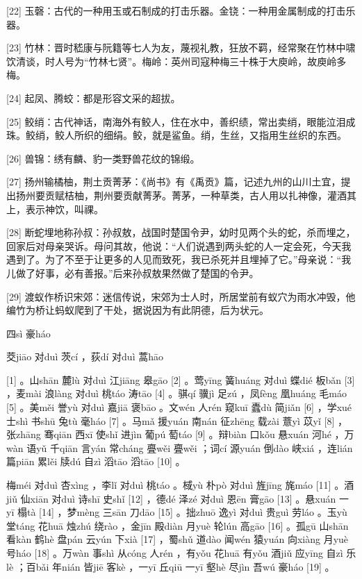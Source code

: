 \documentclass[12pt,UTF8]{ctexbook}
\begin{document}
[22] 玉磬：古代的一种用玉或石制成的打击乐器。金铙：一种用金属制成的打击乐器。

[23] 竹林：晋时嵇康与阮籍等七人为友，蔑视礼教，狂放不羁，经常聚在竹林中啸饮清谈，时人号为“竹林七贤”。梅岭：英州司寇种梅三十株于大庾岭，故庾岭多梅。

[24] 起凤、腾蛟：都是形容文采的超拔。

[25] 鲛绡：古代神话，南海外有鲛人，住在水中，善织绩，常出卖绡，眼能泣泪成珠。鲛绡，鲛人所织的细绢。鲛，就是鲨鱼。绡，生丝，又指用生丝织的东西。

[26] 兽锦：绣有麟、豹一类野兽花纹的锦缎。

[27] 扬州输橘柚，荆土贡菁茅：《尚书》有《禹贡》篇，记述九州的山川土宜，提出扬州要贡赋桔柚，荆州要贡献菁茅。菁茅，一种草类，古人用以扎神像，灌酒其上，表示神饮，叫祼。

[28] 断蛇埋地称孙叔：孙叔敖，战国时楚国令尹，幼时见两个头的蛇，杀而埋之，回家后对母亲哭诉。母问其故，他说：“人们说遇到两头蛇的人一定会死，今天我遇到了。为了不至于让更多的人见而致死，我已杀死并且埋掉了它。”母亲说：“我儿做了好事，必有善报。”后来孙叔敖果然做了楚国的令尹。

[29] 渡蚁作桥识宋郊：迷信传说，宋郊为士人时，所居堂前有蚁穴为雨水冲毁，他编竹为桥让蚂蚁爬到了干处，据说因为有此阴德，后为状元。





四sì 豪háo


茭jiāo 对duì 茨cí ，荻dí 对duì 蒿hāo





[1] 。山shān 麓lù 对duì 江jiāng 皋gāo [2] 。莺yīng 簧huáng 对duì 蝶dié 板bǎn [3] ，麦mài 浪làng 对duì 桃táo 涛tāo [4] 。骐qí 骥jì 足zú ，凤fèng 凰huáng 毛máo [5] 。美měi 誉yù 对duì 嘉jiā 褒bāo 。文wén 人rén 窥kuī 蠹dù 简jiǎn [6] ，学xué 士shì 书shū 兔tù 毫háo [7] 。马mǎ 援yuán 南nán 征zhēng 载zài 薏yì 苡yǐ [8] ，张zhāng 骞qiān 西xī 使shǐ 进jìn 葡pú 萄táo [9] 。辩biàn 口kǒu 悬xuán 河hé ，万wàn 语yǔ 千qiān 言yán 常cháng 亹wěi 亹wěi ；词cí 源yuán 倒dào 峡xiá ，连lián 篇piān 累lěi 牍dú 自zì 滔tāo 滔tāo [10] 。

梅méi 对duì 杏xìng ，李lǐ 对duì 桃táo 。棫yù 朴pò 对duì 旌jīng 旄máo [11] 。酒jiǔ 仙xiān 对duì 诗shī 史shǐ [12] ，德dé 泽zé 对duì 恩ēn 膏gāo [13] 。悬xuán 一yī 榻tà [14] ，梦mèng 三sān 刀dāo [15] 。拙zhuō 逸yì 对duì 贵guì 劳láo 。玉yù 堂táng 花huā 烛zhú 绕rào ，金jīn 殿diàn 月yuè 轮lún 高gāo [16] 。孤gū 山shān 看kàn 鹤hè 盘pán 云yún 下xià [17] ，蜀shǔ 道dào 闻wén 猿yuán 向xiàng 月yuè 号háo [18] 。万wàn 事shì 从cóng 人rén ，有yǒu 花huā 有yǒu 酒jiǔ 应yīng 自zì 乐lè ；百bǎi 年nián 皆jiē 客kè ，一yī 丘qiū 一yī 壑hè 尽jìn 吾wú 豪háo [19] 。
\end{document}
